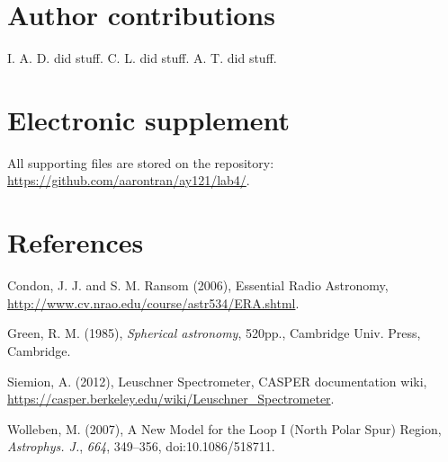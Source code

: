 \documentclass[10pt]{article}
\begin{document}

\section{Author contributions}

I. A. D. did stuff.  C. L. did stuff.  A. T. did stuff.

\section{Electronic supplement}

All supporting files are stored on the repository:\\
\href{https://github.com/aarontran/ay121}
{https://github.com/aarontran/ay121/lab4/}.

\section{References}

\hangindent 0.25in Condon, J. J. and S. M. Ransom (2006), Essential Radio Astronomy, \\
\href{http://www.cv.nrao.edu/course/astr534/ERA.shtml}
{http://www.cv.nrao.edu/course/astr534/ERA.shtml}.

\hangindent 0.25in Green, R. M. (1985), \textit{Spherical astronomy}, 520pp.,
Cambridge Univ. Press, Cambridge.

\hangindent 0.25in Siemion, A. (2012), Leuschner Spectrometer, CASPER documentation wiki, \\
\href{https://casper.berkeley.edu/wiki/Leuschner\_Spectrometer}
{https://casper.berkeley.edu/wiki/Leuschner\_Spectrometer}.

\hangindent 0.25in Wolleben, M. (2007), A New Model for the Loop I (North Polar
Spur) Region, \textit{Astrophys. J.}, \textit{664}, 349--356,
doi:10.1086/518711.
\end{document}
